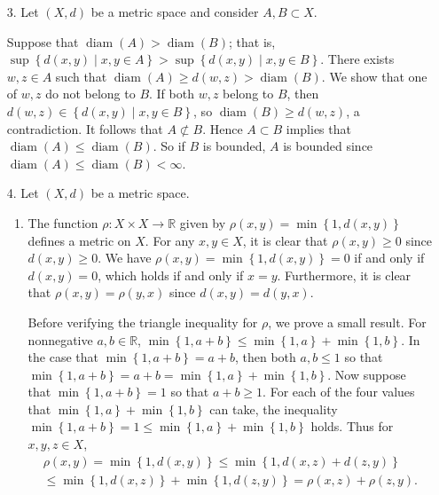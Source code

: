 \documentclass[11pt,leqno]{article}
\theoremstyle{plain}
\theoremstyle{definition}
\numberwithin{equation}{section}
\numberwithin{lem}{section}
\newcommand{\cbr}[1]{\left\{#1\right\}}
\DeclareMathOperator{\diam}{diam}
\begin{document}
\begin{enumerate}
  \item[3.] Let $(X,d)$ be a metric space and consider $A,B\subset X$.
  
  Suppose that $\diam(A)>\diam(B)$; that is, $\sup \cbr{d(x,y)\mid x,y\in A}> \sup \cbr{d(x,y)\mid x,y\in B}$. There exists $w,z\in A$ such that $\diam(A) \geq d(w,z)>\diam(B)$. We show that one of $w,z$ do not belong to $B$. If both $w,z$ belong to $B$, then $d(w,z)\in \cbr{d(x,y)\mid x,y\in B}$, so $\diam(B)\geq d(w,z)$, a contradiction. It follows that $A\not\subset B$. Hence $A\subset B$ implies that $\diam(A)\leq \diam(B)$. So if $B$ is bounded, $A$ is bounded since $\diam(A)\leq \diam(B)< \infty$.
  
  \item[4.] Let $(X,d)$ be a metric space.
  \begin{enumerate}
    \item The function $\rho\colon X\times X\to \mathbb R$ given by $\rho(x,y) = \min\cbr{1,d(x,y)}$ defines a metric on $X$. For any $x,y\in X$, it is clear that $\rho(x,y)\geq 0$ since $d(x,y)\geq 0$. We have $\rho(x,y) = \min\cbr{1,d(x,y)} = 0$ if and only if $d(x,y) = 0$, which holds if and only if $x = y$. Furthermore, it is clear that $\rho(x,y) = \rho(y,x)$ since $d(x,y) = d(y,x)$.
    
    Before verifying the triangle inequality for $\rho$, we prove a small result. For nonnegative $a,b\in\mathbb R$, $\min\cbr{1,a+b}\leq \min\cbr{1,a} + \min\cbr{1,b}$. In the case that $\min\cbr{1,a+b}= a+b$, then both $a,b\leq 1$ so that $\min\cbr{1,a+b} = a+b = \min\cbr{1,a} + \min\cbr{1,b}$. 
    Now suppose that $\min\cbr{1,a+b}= 1$ so that $a+b\geq 1$.
    For each of the four values that $\min\cbr{1,a} + \min\cbr{1,b}$ can take, the inequality $\min\cbr{1,a+b}= 1\leq \min\cbr{1,a} + \min\cbr{1,b}$ holds. Thus for $x,y,z\in X$, \begin{multline*}
      \rho(x,y) = \min\cbr{1,d(x,y)}\leq \min\cbr{1,d(x,z) + d(z,y)}\\\leq \min\cbr{1,d(x,z)} + \min\cbr{1,d(z,y)} = \rho(x,z) + \rho(z,y).
    \end{multline*}


\end{enumerate}
\end{enumerate}
\end{document}
